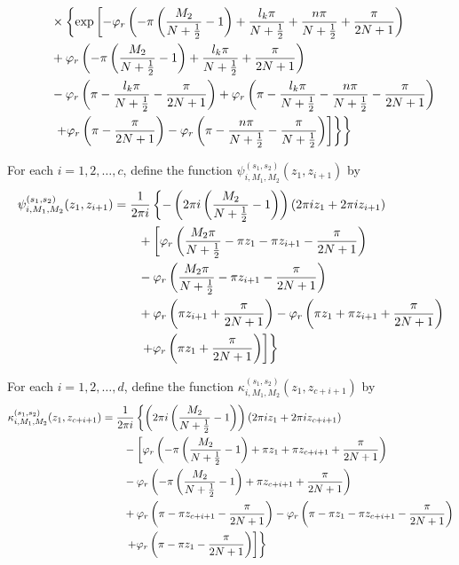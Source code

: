 \documentclass[10pt,a4paper]{article}
\newcommand{\lt}{\left}
\newcommand{\rt}{\right}
\begin{document}
\begin{align}
&\qquad \times \lt\{\exp\lt[-\varphi_r \lt( -\pi  \lt(\frac{M_2}{N+\frac{1}{2}} -1\rt) + \frac{l_k\pi}{N+\frac{1}{2}} + \frac{n\pi}{N+\frac{1}{2}} + \frac{\pi}{2N+1}\rt)\rt. \rt. \notag\\
&\qquad  + \varphi_r\lt( -\pi  \lt(\frac{M_2}{N+\frac{1}{2}} -1\rt) + \frac{l_k\pi}{N+\frac{1}{2}} + \frac{\pi}{2N+1}\rt) \notag \\
&\qquad  - \varphi_r \lt( \pi -\frac{l_k\pi}{N+\frac{1}{2}} - \frac{\pi}{2N+1}\rt) + \varphi_r\lt( \pi -\frac{l_k\pi}{N+\frac{1}{2}} - \frac{n\pi}{N+\frac{1}{2}} - \frac{\pi}{2N+1}\rt) \notag\\
&\lt.\lt.\lt.\qquad + \varphi_r \lt(\pi  -\frac{\pi}{2N+1}\rt)  - \varphi_r\lt(\pi -\frac{n\pi}{N+\frac{1}{2}} - \frac{\pi}{N+\frac{1}{2}}\rt) \rt] \rt\}  \rt\}
\end{align}
\fi

For each $i = 1,2,\dots,c$, define the function $\psi_{i,M_1,M_2}^{(s_1,s_2)}(z_1,z_{i+1})$ by
\begin{align}
\psi_{i,M_1,M_2}^{(s_1,s_2)} (z_1,z_{i+1})
&= \frac{1}{2\pi i}\lt\{ - \lt(2\pi i \lt(\frac{M_2}{N+\frac{1}{2}} - 1\rt)\rt)(2\pi i z_1 + 2\pi i z_{i+1}) \rt. \notag \\
&\qquad  + \lt[\varphi_r \lt(\frac{M_2\pi}{N+\frac{1}{2}} - \pi z_1 - \pi z_{i+1} -\frac{\pi}{2N+1}\rt) \rt.  \notag\\
&\qquad  - \varphi_r\lt( \frac{M_2\pi}{N+\frac{1}{2}} - \pi z_{i+1}- \frac{\pi}{2N+1}\rt) \notag \\
&\qquad  + \varphi_r \lt(\pi z_{i+1} + \frac{\pi}{2N+1}\rt)  - \varphi_r\lt( \pi z_1 + \pi z_{i+1} + \frac{\pi}{2N+1}\rt) \notag\\
&\lt.\lt.\qquad  + \varphi_r\lt( \pi z_1 + \frac{\pi}{2N+1}\rt) \rt] \rt\}
\end{align}

For each $i = 1,2, \dots, d$, define the function $\kappa_{i,M_1,M_2}^{(s_1,s_2)} (z_1, z_{c+i+1})$ by
\begin{align}
\kappa_{i,M_1,M_2}^{(s_1,s_2)} (z_1,z_{c+i+1})
&= \frac{1}{2\pi i}\lt\{  \lt(2\pi i \lt(\frac{M_2}{N+\frac{1}{2}} - 1\rt)\rt)(2\pi i z_1 + 2\pi i z_{c+i+1}) \rt. \notag \\
&\qquad  -  \lt[\varphi_r \lt( -\pi  \lt(\frac{M_2}{N+\frac{1}{2}} -1\rt) + \pi z_1 + \pi z_{c+i+1} + \frac{\pi}{2N+1}\rt) \rt.  \notag\\
&\qquad  - \varphi_r\lt( -\pi  \lt(\frac{M_2}{N+\frac{1}{2}} -1\rt) + \pi z_{c+i+1} + \frac{\pi}{2N+1}\rt) \notag \\
&\qquad  + \varphi_r \lt( \pi -\pi z_{c+i+1} - \frac{\pi}{2N+1}\rt)  - \varphi_r\lt( \pi - \pi z_1 - \pi z_{c+i+1} - \frac{\pi}{2N+1}\rt) \notag\\
&\lt.\lt.\qquad  + \varphi_r\lt( \pi - \pi z_1 - \frac{\pi}{2N+1}\rt) \rt] \rt\}
\end{align}
\end{document}
